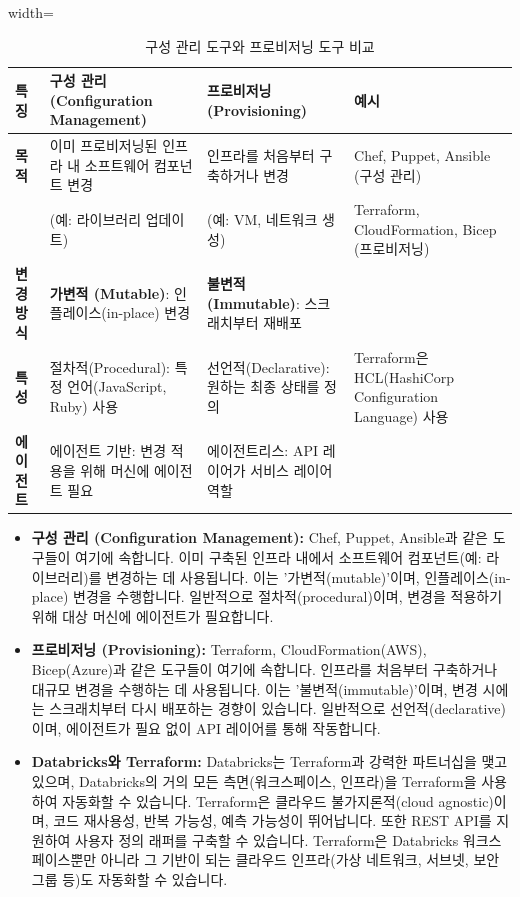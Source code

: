 \documentclass[11pt,a4paper]{article}
\begin{document}
\begin{table}[h!]
\centering
\caption{구성 관리 도구와 프로비저닝 도구 비교}
\label{tab:iac_tools_comparison}
\begin{adjustbox}{width=\textwidth}
\begin{tabular}{llll}
\toprule
\textbf{특징} & \textbf{구성 관리 (Configuration Management)} & \textbf{프로비저닝 (Provisioning)} & \textbf{예시} \\
\midrule
\textbf{목적} & 이미 프로비저닝된 인프라 내 소프트웨어 컴포넌트 변경 & 인프라를 처음부터 구축하거나 변경 & Chef, Puppet, Ansible (구성 관리) \\
& (예: 라이브러리 업데이트) & (예: VM, 네트워크 생성) & Terraform, CloudFormation, Bicep (프로비저닝) \\
\textbf{변경 방식} & \textbf{가변적 (Mutable)}: 인플레이스(in-place) 변경 & \textbf{불변적 (Immutable)}: 스크래치부터 재배포 & \\
\textbf{특성} & 절차적(Procedural): 특정 언어(JavaScript, Ruby) 사용 & 선언적(Declarative): 원하는 최종 상태를 정의 & Terraform은 HCL(HashiCorp Configuration Language) 사용 \\
\textbf{에이전트} & 에이전트 기반: 변경 적용을 위해 머신에 에이전트 필요 & 에이전트리스: API 레이어가 서비스 레이어 역할 & \\
\bottomrule
\end{tabular}
\end{adjustbox}
\end{table}

\begin{itemize}
    \item \textbf{구성 관리 (Configuration Management):}
    Chef, Puppet, Ansible과 같은 도구들이 여기에 속합니다. 이미 구축된 인프라 내에서 소프트웨어 컴포넌트(예: 라이브러리)를 변경하는 데 사용됩니다. 이는 '가변적(mutable)'이며, 인플레이스(in-place) 변경을 수행합니다. 일반적으로 절차적(procedural)이며, 변경을 적용하기 위해 대상 머신에 에이전트가 필요합니다.

    \item \textbf{프로비저닝 (Provisioning):}
    Terraform, CloudFormation(AWS), Bicep(Azure)과 같은 도구들이 여기에 속합니다. 인프라를 처음부터 구축하거나 대규모 변경을 수행하는 데 사용됩니다. 이는 '불변적(immutable)'이며, 변경 시에는 스크래치부터 다시 배포하는 경향이 있습니다. 일반적으로 선언적(declarative)이며, 에이전트가 필요 없이 API 레이어를 통해 작동합니다.

    \item \textbf{Databricks와 Terraform:}
    Databricks는 Terraform과 강력한 파트너십을 맺고 있으며, Databricks의 거의 모든 측면(워크스페이스, 인프라)을 Terraform을 사용하여 자동화할 수 있습니다. Terraform은 클라우드 불가지론적(cloud agnostic)이며, 코드 재사용성, 반복 가능성, 예측 가능성이 뛰어납니다. 또한 REST API를 지원하여 사용자 정의 래퍼를 구축할 수 있습니다. Terraform은 Databricks 워크스페이스뿐만 아니라 그 기반이 되는 클라우드 인프라(가상 네트워크, 서브넷, 보안 그룹 등)도 자동화할 수 있습니다.
\end{itemize}
\end{document}
